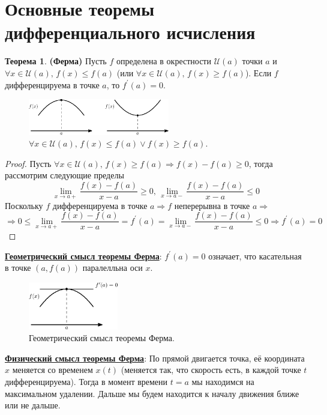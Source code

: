 \documentclass[12pt]{article}
\newcommand{\MU}{\mathcal{U}}
\theoremstyle{definition}
\newtheorem{theorem}{Теорема}
\begin{document}
\newpage
\section*{Основные теоремы дифференциального исчисления}
\begin{theorem}\textbf{(Ферма)}
	Пусть $f$ определена в окрестности $\MU(a)$ точки $a$ и $\forall x \in \MU(a), \, f(x) \leq f(a)$ (или $\forall x \in \MU(a), \, f(x) \geq f(a)$). Если $f$ дифференцируема в точке $a$, то $f^\prime(a) = 0$.
\end{theorem}

\begin{figure}[H]
	\centering
	\includegraphics[width=0.55\textwidth]{23_1.eps}
	\caption{$\forall x \in \MU(a), \, f(x) \leq f(a) \vee f(x) \geq f(a)$.}
	\label{23_1}
\end{figure}

\begin{proof}
	Пусть $\forall x \in \MU(a), \, f(x) \geq f(a) \Rightarrow f(x) - f(a) \geq 0$, тогда рассмотрим следующие пределы 
	$$\lim\limits_{x \to a+}\dfrac{f(x) - f(a)}{x-a} \geq 0, \, \lim\limits_{x \to a-}\dfrac{f(x) - f(a)}{x-a} \leq 0$$
	Поскольку $f$ дифференцируема в точке $a \Rightarrow f$ неперерывна в точке $a \Rightarrow$
	$$ \Rightarrow 0 \leq \lim\limits_{x \to a+}\dfrac{f(x) - f(a)}{x-a} = f^\prime(a) = \lim\limits_{x \to a-}\dfrac{f(x) - f(a)}{x-a} \leq 0 \Rightarrow f^\prime(a)   = 0$$
\end{proof}
\uline{\textbf{Геометрический смысл теоремы Ферма}}: $f^\prime(a) = 0$ означает, что касательная в точке $(a,f(a))$ паралелльна оси $x$.
\begin{figure}[H]
	\centering
	\includegraphics[width=0.35\textwidth]{23_2.eps}
	\caption{Геометрический смысл теоремы Ферма.}
	\label{23_2}
\end{figure}
\uline{\textbf{Физический смысл теоремы Ферма}}: По прямой двигается точка, её координата $x$ меняется со временем $x(t)$ (меняется так, что скорость есть, в каждой точке $t$ дифференцируема). Тогда в момент времени $t = a$ мы находимся на максимальном удалении. Дальше мы будем находится к началу движения ближе или не дальше.
\end{document}
